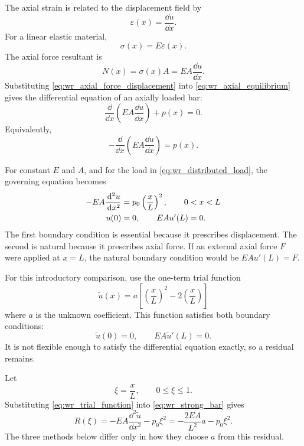 The axial strain is related to the displacement field by
\begin{equation}
    \varepsilon(x) = \frac{\dd u}{\dd x}.
    \label{eq:wr_axial_strain}
\end{equation}
For a linear elastic material,
\begin{equation}
    \sigma(x) = E\varepsilon(x).
    \label{eq:wr_hooke_law}
\end{equation}
The axial force resultant is
\begin{equation}
    N(x) = \sigma(x)A = EA\frac{\dd u}{\dd x}.
    \label{eq:wr_axial_force_displacement}
\end{equation}
Substituting \cref{eq:wr_axial_force_displacement} into
\cref{eq:wr_axial_equilibrium} gives the differential equation of an axially
loaded bar:
\begin{equation}
    \frac{\dd}{\dd x}\!\left(EA\frac{\dd u}{\dd x}\right) + p(x) = 0 .
    \label{eq:wr_general_strong_bar}
\end{equation}
Equivalently,
\begin{equation}
    -\frac{\dd}{\dd x}\!\left(EA\frac{\dd u}{\dd x}\right) = p(x).
\end{equation}

For constant $E$ and $A$, and for the load in
\cref{eq:wr_distributed_load}, the governing equation becomes
\begin{align}
    -EA \frac{\,\mathrm{d}^2 u}{\,\mathrm{d} x^2} &= p_0\left(\frac{x}{L}\right)^2,
    \qquad 0 < x < L
    \label{eq:wr_strong_bar} \\
    u(0) &= 0, \qquad EA u'(L) = 0 .
    \notag
\end{align}
The first boundary condition is essential because it prescribes displacement.
The second is natural because it prescribes axial force. If an external axial
force $F$ were applied at $x=L$, the natural boundary condition would be
$EAu'(L)=F$.

For this introductory comparison, use the one-term trial function
\begin{equation}
    \tilde{u}(x) = a \left[\left(\frac{x}{L}\right)^2
    - 2\left(\frac{x}{L}\right)\right]
    \label{eq:wr_trial_function}
\end{equation}
where $a$ is the unknown coefficient. This function satisfies both boundary
conditions:
\[
    \tilde{u}(0)=0, \qquad EA\tilde{u}'(L)=0 .
\]
It is not flexible enough to satisfy the differential equation exactly, so a
residual remains.

Let
\[
    \xi = \frac{x}{L}, \qquad 0 \leq \xi \leq 1 .
\]
Substituting \cref{eq:wr_trial_function} into \cref{eq:wr_strong_bar} gives
\begin{equation}
    R(\xi) =
    -EA \frac{\dd^2\tilde{u}}{\dd x^2} - p_0\xi^2
    =
    -\frac{2EA}{L^2}a - p_0\xi^2 .
    \label{eq:wr_bar_residual}
\end{equation}
The three methods below differ only in how they choose $a$ from this residual.

